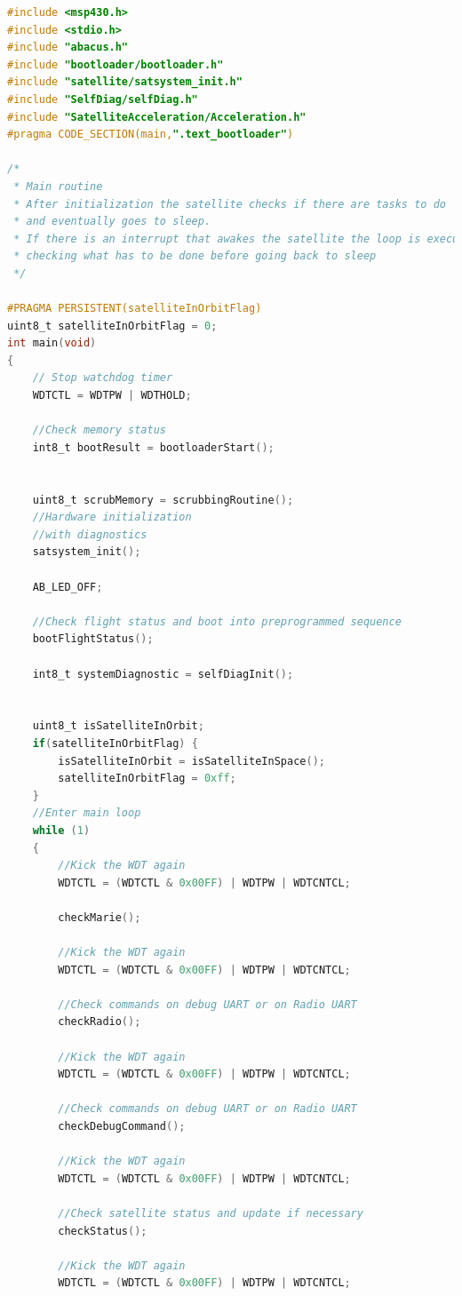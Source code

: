 \documentclass[LaM,binding=0.6cm]{../sapthesis}
\begin{document}
\begin{small}
\begin{lstlisting}[language=C]
#include <msp430.h>
#include <stdio.h>
#include "abacus.h"
#include "bootloader/bootloader.h"
#include "satellite/satsystem_init.h"
#include "SelfDiag/selfDiag.h"
#include "SatelliteAcceleration/Acceleration.h"
#pragma CODE_SECTION(main,".text_bootloader")

/*
 * Main routine
 * After initialization the satellite checks if there are tasks to do 
 * and eventually goes to sleep.
 * If there is an interrupt that awakes the satellite the loop is executed
 * checking what has to be done before going back to sleep
 */
 
#PRAGMA PERSISTENT(satelliteInOrbitFlag)
uint8_t satelliteInOrbitFlag = 0;
int main(void)
{
    // Stop watchdog timer
    WDTCTL = WDTPW | WDTHOLD;

    //Check memory status
    int8_t bootResult = bootloaderStart();


    uint8_t scrubMemory = scrubbingRoutine();
    //Hardware initialization
    //with diagnostics
    satsystem_init();

    AB_LED_OFF;

    //Check flight status and boot into preprogrammed sequence
    bootFlightStatus();

    int8_t systemDiagnostic = selfDiagInit();


    uint8_t isSatelliteInOrbit;
    if(satelliteInOrbitFlag) {
        isSatelliteInOrbit = isSatelliteInSpace();
        satelliteInOrbitFlag = 0xff;
    }
    //Enter main loop
    while (1)
    {
        //Kick the WDT again
        WDTCTL = (WDTCTL & 0x00FF) | WDTPW | WDTCNTCL;

        checkMarie();

        //Kick the WDT again
        WDTCTL = (WDTCTL & 0x00FF) | WDTPW | WDTCNTCL;

        //Check commands on debug UART or on Radio UART
        checkRadio();

        //Kick the WDT again
        WDTCTL = (WDTCTL & 0x00FF) | WDTPW | WDTCNTCL;

        //Check commands on debug UART or on Radio UART
        checkDebugCommand();

        //Kick the WDT again
        WDTCTL = (WDTCTL & 0x00FF) | WDTPW | WDTCNTCL;

        //Check satellite status and update if necessary
        checkStatus();

        //Kick the WDT again
        WDTCTL = (WDTCTL & 0x00FF) | WDTPW | WDTCNTCL;


\end{lstlisting}
\end{small}
\end{document}
